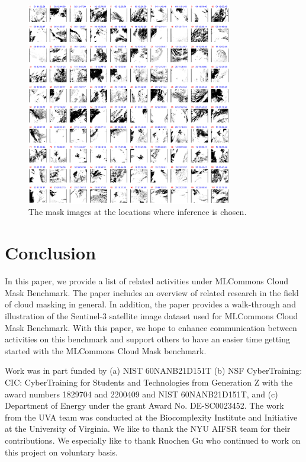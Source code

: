 \documentclass[sigplan,screen]{acmart}
\begin{document}
\begin{figure}[htb]
\centering\includegraphics[width=0.8\textwidth]{images/masks-output.png}
\caption{The mask images at the locations where inference is chosen.}
\label{fig:frames-mask}
\end{figure}



\section{Conclusion}


In this paper, we provide a list of related activities under MLCommons Cloud Mask Benchmark. The paper includes an overview of related research in the field of cloud masking in general. In addition, the paper provides a walk-through and illustration of the Sentinel-3 satellite image dataset used for MLCommons Cloud Mask Benchmark. With this paper, we hope to enhance communication between activities on this benchmark and support others to have an easier time getting started with the MLCommons Cloud Mask benchmark.

\begin{acks}

Work was in part funded by (a) NIST 60NANB21D151T  (b) NSF CyberTraining: CIC: CyberTraining for Students and Technologies from Generation Z with the award numbers 1829704 and 2200409 and NIST 60NANB21D151T, and (c) Department of Energy under the grant Award No. DE-SC0023452. The work from the UVA team was conducted at the Biocomplexity Institute and Initiative at the University of Virginia.
We like to thank the NYU AIFSR team for their contributions. We especially like to thank Ruochen Gu who continued to work on this project on voluntary basis.


\end{acks}
\end{document}

